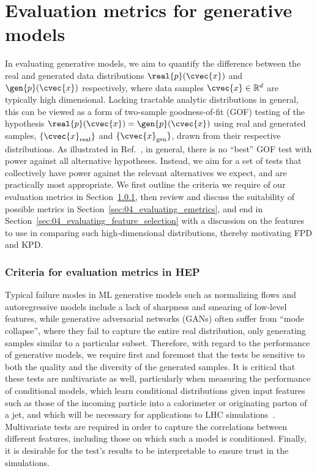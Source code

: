 \section{Evaluation metrics for generative models}
\label{sec:04_evaluating_metrics}

In evaluating generative models, we aim to quantify the difference between the real and generated data distributions $\real{p}(\cvec{x})$ and $\gen{p}(\cvec{x})$ respectively, where data samples $\cvec{x} \in \mathbb{R}^d$ are typically high dimensional.
Lacking tractable analytic distributions in general, this can be viewed as a form of two-sample goodness-of-fit (GOF) testing of the hypothesis $\real{p}(\cvec{x}) = \gen{p}(\cvec{x})$ using real and generated samples, $\{\cvec{x}_{\mathrm{real}}\}$ and $\{\cvec{x}_{\mathrm{gen}}\}$, drawn from their respective distributions.
As illustrated in Ref.~\cite{cousins_gof}, in general, there is no ``best'' GOF test with power against all alternative hypotheses. 
Instead, we aim for a set of tests that collectively have power against the relevant alternatives we expect, and are practically most appropriate.
We first outline the criteria we require of our evaluation metrics in Section~\ref{sec:04_evaluating_criteria}, then review and discuss the suitability of possible metrics in Section~\ref{sec:04_evaluating_emetrics}, and end in Section~\ref{sec:04_evaluating_feature_selection} with a discussion on the features to use in comparing such high-dimensional distributions, thereby motivating FPD and KPD.

\subsubsection{Criteria for evaluation metrics in HEP}
\label{sec:04_evaluating_criteria}

Typical failure modes in ML generative models such as normalizing flows and autoregressive models include a lack of sharpness and smearing of low-level features, while generative adversarial networks (GANs) often suffer from ``mode collapse'', where they fail to capture the entire real distribution, only generating samples similar to a particular subset. 
Therefore, with regard to the performance of generative models, we require first and foremost that the tests be sensitive to both the quality and the diversity of the generated samples.
It is critical that these tests are multivariate as well, particularly when measuring the performance of conditional models, which learn conditional distributions given input features such as those of the incoming particle into a calorimeter or originating parton of a jet, and which will be necessary for applications to LHC simulations~\cite{Butter:2022rso}.
Multivariate tests are required in order to capture the correlations between different features, including those on which such a model is conditioned. 
Finally, it is desirable for the test's results to be interpretable to ensure trust in the simulations. 

